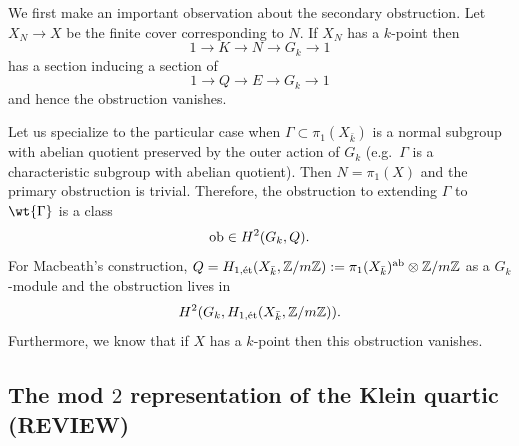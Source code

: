\documentclass[main.tex]{subfiles}
\begin{document}
We first make an important observation about the secondary obstruction. Let $X_N \to X$ be the finite \etale cover corresponding to $N$.
If $X_N$ has a $k$-point then
\[ 1 \to K \to N \to G_k \to 1 \]
has a section inducing a section of
\[ 1 \to Q \to E \to G_k \to 1 \]
and hence the obstruction vanishes.

Let us specialize to the particular case when $\Gamma \subset \pi_1(X_{\bar{k}})$ is a normal subgroup with abelian quotient preserved by the outer action of $G_k$ (e.g.\ $\Gamma$ is a characteristic subgroup with abelian quotient). Then $N = \pi_1(X)$ and the primary obstruction is trivial. Therefore, the obstruction to extending $\Gamma$ to $\wt{\Gamma}$ is a class 
\[ \mathrm{ob} \in H^2(G_k, Q). \]
For Macbeath's construction, $Q = H_{1,\mathrm{\acute{e}t}}(X_{\bar{k}}, \mathbb{Z}/m\mathbb{Z}) := \pi_1(X_{\bar{k}})^{\mathrm{ab}} \otimes \mathbb{Z} / m \mathbb{Z}$ as a $G_k$-module and the obstruction lives in 
\[ H^2(G_k, H_{1,\mathrm{\acute{e}t}}(X_{\bar{k}}, \mathbb{Z}/m\mathbb{Z})). \]
Furthermore, we know that if $X$ has a $k$-point then this obstruction vanishes. 

\subsection{The mod $2$ representation of the Klein quartic (REVIEW)} \label{sec:mod2_rep}
\end{document}
